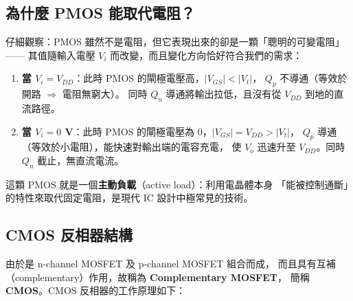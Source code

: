 \documentclass[12pt]{article}
\begin{document}
\subsection*{為什麼 PMOS 能取代電阻？}

仔細觀察：PMOS 雖然不是電阻，但它表現出來的卻是一顆「聰明的可變電阻」——
其值隨輸入電壓 $V_i$ 而改變，而且變化方向恰好符合我們的需求：

\begin{enumerate}[leftmargin=2.2em,itemsep=2pt]
  \item \textbf{當 $V_i = V_{DD}$}：此時 PMOS 的閘極電壓高，$|V_{GS}| < |V_t|$，
    $Q_p$ 不導通（等效於開路 $\Rightarrow$ 電阻無窮大）。
    同時 $Q_n$ 導通將輸出拉低，且沒有從 $V_{DD}$ 到地的直流路徑。
  \item \textbf{當 $V_i = 0$ V}：此時 PMOS 的閘極電壓為 0，$|V_{GS}| = V_{DD} > |V_t|$，
    $Q_p$ 導通（等效於小電阻），能快速對輸出端的電容充電，
    使 $V_o$ 迅速升至 $V_{DD}$。同時 $Q_n$ 截止，無直流電流。
\end{enumerate}

這顆 PMOS 就是一個\textbf{主動負載}（active load）：利用電晶體本身
「能被控制通斷」的特性來取代固定電阻，是現代 IC 設計中極常見的技術。

\subsection*{CMOS 反相器結構}


由於是 n-channel MOSFET 及 p-channel MOSFET 組合而成，
而且具有互補（complementary）作用，故稱為 \textbf{Complementary MOSFET}，
簡稱 \textbf{CMOS}。CMOS 反相器的工作原理如下：
\end{document}
